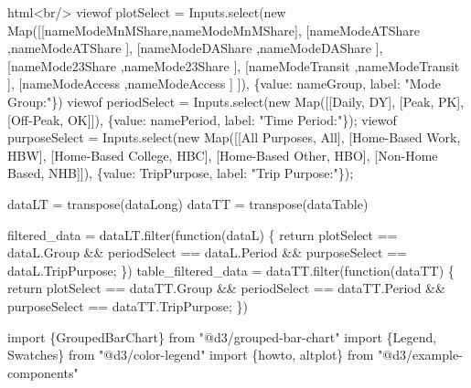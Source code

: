 \documentclass[
  letterpaper,
  DIV=11,
  numbers=noendperiod]{scrreprt}
\newenvironment{Shaded}{\begin{snugshade}}{\end{snugshade}}
\newcommand{\NormalTok}[1]{\textcolor[rgb]{0.00,0.23,0.31}{#1}}
\begin{document}
\begin{Shaded}
\begin{Highlighting}[]
\NormalTok{html\textasciigrave{}\textless{}br/\textgreater{}\textasciigrave{}}
\NormalTok{viewof plotSelect    = Inputs.select(new Map([[nameModeMnMShare,nameModeMnMShare],}
\NormalTok{                                              [nameModeATShare ,nameModeATShare ],}
\NormalTok{                                              [nameModeDAShare ,nameModeDAShare ],}
\NormalTok{                                              [nameMode23Share ,nameMode23Share ],}
\NormalTok{                                              [nameModeTransit ,nameModeTransit ],}
\NormalTok{                                              [nameModeAccess  ,nameModeAccess  ]}
\NormalTok{                                             ]), \{value: nameGroup, label: "Mode Group:"\})}
\NormalTok{viewof periodSelect  = Inputs.select(new Map([[\textquotesingle{}Daily\textquotesingle{}, \textquotesingle{}DY\textquotesingle{}], [\textquotesingle{}Peak\textquotesingle{}, \textquotesingle{}PK\textquotesingle{}], [\textquotesingle{}Off{-}Peak\textquotesingle{}, \textquotesingle{}OK\textquotesingle{}]]), \{value: namePeriod, label: "Time Period:"\});}
\NormalTok{viewof purposeSelect = Inputs.select(new Map([[\textquotesingle{}All Purposes\textquotesingle{}, \textquotesingle{}All\textquotesingle{}], [\textquotesingle{}Home{-}Based Work\textquotesingle{}, \textquotesingle{}HBW\textquotesingle{}], [\textquotesingle{}Home{-}Based College\textquotesingle{}, \textquotesingle{}HBC\textquotesingle{}], [\textquotesingle{}Home{-}Based Other\textquotesingle{}, \textquotesingle{}HBO\textquotesingle{}], [\textquotesingle{}Non{-}Home Based\textquotesingle{}, \textquotesingle{}NHB\textquotesingle{}]]), \{value: \textquotesingle{}TripPurpose\textquotesingle{}, label: "Trip Purpose:"\});}

\NormalTok{dataLT = transpose(dataLong)}
\NormalTok{dataTT = transpose(dataTable)}

\NormalTok{filtered\_data = dataLT.filter(function(dataL) \{}
\NormalTok{    return plotSelect == dataL.Group \&\&}
\NormalTok{           periodSelect == dataL.Period \&\&}
\NormalTok{           purposeSelect == dataL.TripPurpose;}
\NormalTok{\})}
\NormalTok{table\_filtered\_data = dataTT.filter(function(dataTT) \{}
\NormalTok{    return plotSelect == dataTT.Group \&\&}
\NormalTok{           periodSelect == dataTT.Period \&\&}
\NormalTok{           purposeSelect == dataTT.TripPurpose;}
\NormalTok{\})}

\NormalTok{import \{GroupedBarChart\} from "@d3/grouped{-}bar{-}chart"}
\NormalTok{import \{Legend, Swatches\} from "@d3/color{-}legend"}
\NormalTok{import \{howto, altplot\} from "@d3/example{-}components"}


\end{Highlighting}
\end{Shaded}
\end{document}
